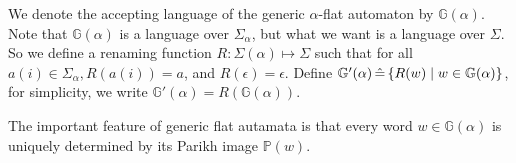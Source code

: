 {We denote the accepting language of the generic $\alpha$-flat automaton by $\mathbb{G}(\alpha)$.
Note that $\mathbb{G}(\alpha)$ is a language over $\Sigma_\alpha$,
but what we want is a language over $\Sigma$.
So we define a renaming function $R:\Sigma(\alpha)\mapsto \Sigma$ such that for all $a(i) \in \Sigma_\alpha, R(a(i))=a$,
and $R(\epsilon) = \epsilon$.
Define $\mathbb{G}'(\alpha) \, \hat{=} \, \{R(w) \mid w\in \mathbb{G}(\alpha)\}$, 
for simplicity, we write
$\mathbb{G}'(\alpha)=R(\mathbb{G}(\alpha))$.

The important feature of generic flat autamata
is that every word $w\in \mathbb{G}(\alpha)$ is uniquely determined by its Parikh image $\mathbb{P}(w)$.
}


